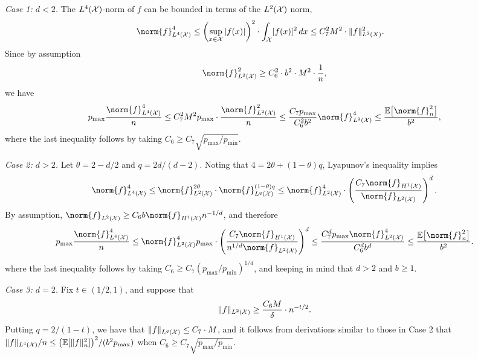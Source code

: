 \textit{Case 1: $d < 2$.}
The $L^4(\mathcal{X})$-norm of $f$ can be bounded in terms of the $L^2(\mathcal{X})$ norm,
\begin{align*}
\norm{f}_{\Leb^4(\Xset)}^4 & \leq \left(\sup_{x \in \Xset} \abs{f(x)}\right)^2 \cdot \int_{\Xset} [f(x)]^2 \,dx \leq C_7^2 M^2 \cdot \|f\|_{\Leb^2(X)}^2.
\end{align*}
Since by assumption
\begin{equation*}
\norm{f}_{\Leb^2(\Xset)}^2 \geq C_6^2 \cdot b^2 \cdot M^2 \cdot \frac{1}{n},
\end{equation*}
we have
\begin{equation*}
p_{\max} \frac{\norm{f}_{\Leb^4(\Xset)}^4}{n} \leq C_7^2 M^2p_{\max} \cdot \frac{\norm{f}_{\Leb^2(\Xset)}^2}{n} \leq \frac{C_7p_{\max}}{C_6^2 b^2} \norm{f}_{\Leb^2(\Xset)}^4 \leq \frac{\Ebb\bigl[\norm{f}_n^2\bigr]}{b^2},
\end{equation*}
where the last inequality follows by taking $C_6 \geq C_7 \sqrt{p_{\max}/p_{\min}}$.

\textit{Case 2: $d > 2$.}
Let $\theta = 2 - d/2$ and $q = 2d/(d - 2)$. Noting that $4 = 2\theta + (1 - \theta)q$, Lyapunov's inequality implies
\begin{equation*}
\norm{f}_{\Leb^4(\Xset)}^4 \leq \norm{f}_{\Leb^2(\Xset)}^{2\theta} \cdot \norm{f}_{\Leb^q(\Xset)}^{(1 - \theta)q} \leq \norm{f}_{\Leb^2(\Xset)}^{4} \cdot \left(\frac{C_7\norm{f}_{H^1(\Xset)}}{\norm{f}_{\Leb^2(\Xset)}}\right)^{d}.
\end{equation*}
By assumption, $\norm{f}_{\Leb^2(\Xset)} \geq C_6 b \norm{f}_{H^1(\Xset)} n^{-1/d}$, and therefore
\begin{equation*}
p_{\max} \frac{\norm{f}_{\Leb^4(\Xset)}^4}{n} \leq \norm{f}_{\Leb^2(\Xset)}^4p_{\max} \cdot \left(\frac{C_7\norm{f}_{H^1(\Xset)}}{n^{1/d}\norm{f}_{\Leb^2(\Xset)}}\right)^{d} \leq \frac{C_7^dp_{\max}\norm{f}_{\Leb^2(\Xset)}^4}{C_6^db^{d}} \leq \frac{\Ebb\bigl[\norm{f}_n^2\bigr]}{b^2}.
\end{equation*}
where the last inequality follows by taking $C_6 \geq C_7(p_{\max}/p_{\min})^{1/d}$, and keeping in mind that $d > 2$ and $b \geq 1$. 

\textit{Case 3: $d = 2$.}
Fix $t \in (1/2,1)$, and suppose that
\begin{equation}
\label{pf:empirical_norm_sobolev_1}
\|f\|_{L^2(\mathcal{X})} \geq \frac{C_6 M}{\delta} \cdot n^{-t/2}.
\end{equation} 
Putting $q = 2/(1 - t)$, we have that $\|f\|_{L^{q}(\mathcal{X})} \leq C_7 \cdot M$, and it follows from derivations similar to those in Case 2 that $\|f\|_{L^4(\mathcal{X})}/n \leq \bigl(\mathbb{E}[\|f\|_n^2]\bigr)^2/(b^2p_{\max})$ when $C_6 \geq C_7 \sqrt{p_{\max}/p_{\min}}$.

